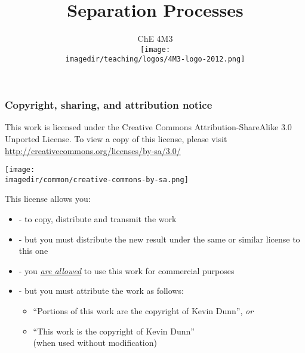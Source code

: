 \documentclass[11pt]{beamer}
\title[]{\LARGE Separation Processes}
\subtitle[]{\Large ChE 4M3 \\ \vspace{0.5cm} \texttt{[image: \\imagedir/teaching/logos/4M3-logo-2012.png]} \vspace{-1.5cm} }\author[]{}
\institute[]{}
\date[]{\copyright~ Kevin Dunn, \today \\ \vspace{1cm}{\footnotesize {\tt kevin.dunn@mcmaster.ca}\\ \href{http://learnche.mcmaster.ca/4M3}{http://learnche.mcmaster.ca/4M3}\\ \vspace{1cm}}

{\footnotesize Overall revision number: \hgversion (\monthname~\THEYEAR)} %
}
\begin{document}
	
\begin{frame} \titlepage \end{frame}

\begin{frame}\frametitle{Copyright, sharing, and attribution notice}

	{\footnotesize This work is licensed under the Creative Commons Attribution-ShareAlike 3.0 Unported License. To view a copy of this license, 
	please visit \href{http://creativecommons.org/licenses/by-sa/3.0/}{http://creativecommons.org/licenses/by-sa/3.0/}}
	\vspace{-1.0cm}
	\begin{flushright}
		\texttt{[image: \\imagedir/common/creative-commons-by-sa.png]}
	\end{flushright}	
	\vspace{-0.2cm}
	\begin{exampleblock}{}
		{\small This license allows you: }
		\begin{itemize}
			\item	{} - to copy, distribute and transmit the work
			\item	{} - but you must distribute the new result under the same or similar license to this one
			\item	{} - you \underline{\emph{are allowed}} to use this work for commercial purposes 
			\item	{} - but you must attribute the work as follows:
			\begin{itemize}
				\item	``Portions of this work are the copyright of Kevin Dunn'', \emph{or}
				\item	``This work is the copyright of Kevin Dunn'' \\{\tiny (when used without modification)}
			\end{itemize} 
		\end{itemize}
	\end{exampleblock}
\end{frame}
\end{document}
